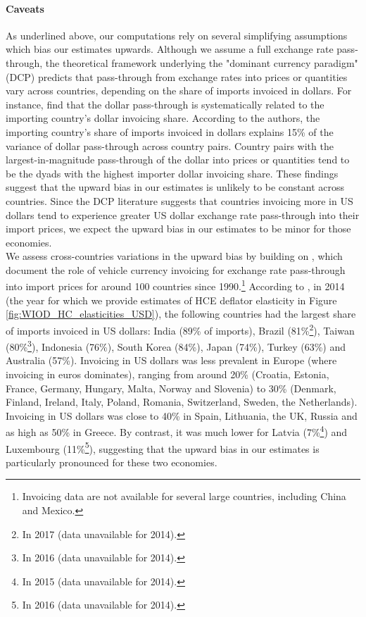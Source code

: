 \documentclass[11pt,a4paper]{paper} %
\begin{document}
\paragraph{Caveats}
As underlined above, our computations rely on several simplifying assumptions which bias our estimates upwards. 
Although we assume a full exchange rate pass-through, the theoretical framework underlying the "dominant currency paradigm" (DCP) predicts that pass-through from exchange rates into prices or quantities vary across countries, depending on the share of imports invoiced in dollars. 
For instance, \cite{Boz2019} find that the dollar pass-through is systematically related to the importing country’s dollar invoicing share.
According to the authors, the importing country’s share of imports invoiced in dollars explains 15\% of the variance of dollar pass-through across country pairs. 
Country pairs with the largest-in-magnitude pass-through of the dollar into prices or quantities tend to be the dyads with the highest importer dollar invoicing share.
These findings suggest that the upward bias in our estimates is unlikely to be constant across countries. 
Since the DCP literature suggests that countries invoicing more in US dollars tend to experience greater US dollar exchange rate pass-through into their import prices, we expect the upward bias in our estimates to be minor for those economies.\\
We assess cross-countries variations in the upward bias by building on \cite{Boz2020}, which document the role of vehicle currency invoicing for exchange rate pass-through into import prices for around 100 countries since 1990.\footnote{Invoicing data are not available for several large countries, including China and Mexico.}
According to \cite{Boz2020}, in 2014 (the year for which we provide estimates of HCE deflator elasticity in Figure \ref{fig:WIOD_HC_elasticities_USD}), the following countries had the largest share of imports invoiced in US dollars: India (89\% of imports), Brazil (81\%\footnote{In 2017 (data unavailable for 2014).}), Taiwan (80\%\footnote{In 2016 (data unavailable for 2014).}), Indonesia (76\%), South Korea (84\%), Japan (74\%), Turkey (63\%) and Australia (57\%).
Invoicing in US dollars was less prevalent in Europe (where invoicing in euros dominates), ranging from around 20\% (Croatia, Estonia, France, Germany, Hungary, Malta, Norway and Slovenia) to 30\% (Denmark, Finland, Ireland, Italy, Poland, Romania, Switzerland, Sweden, the Netherlands). 
Invoicing in US dollars was close to 40\% in Spain, Lithuania, the UK, Russia and as high as 50\% in Greece. 
By contrast, it was much lower for Latvia (7\%\footnote{In 2015 (data unavailable for 2014).}) and Luxembourg (11\%\footnote{In 2016 (data unavailable for 2014).}), suggesting that the upward bias in our estimates is particularly pronounced for these two economies. 
\end{document}
